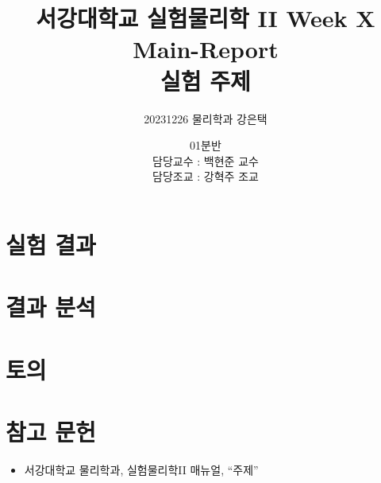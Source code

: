 \documentclass{oblivoir}
\title{\textbf{서강대학교 실험물리학 II Week X Main-Report\\ 실험 주제}}
\author{20231226 물리학과 강은택}
\date{01분반\\담당교수 : 백현준 교수 \\담당조교 : 강혁주 조교}
\begin{document}
\maketitle
\tableofcontents
\newpage

\section{실험 결과}

\section{결과 분석}

\section{토의}

\section{참고 문헌}
\begin{itemize}
\item 서강대학교 물리학과, 실험물리학II 매뉴얼, ``주제''
\end{itemize}
\end{document}
